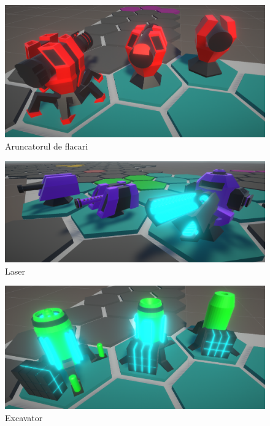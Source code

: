 \documentclass[12pt, a4paper]{article}
\begin{document}
	\begin{figure}[H]
		\centering
		\includegraphics[width=1\textwidth]{machineCannon.png}
		\caption{Aruncatorul de flacari}
		\label{fig: machineCannon}
	\end{figure}
	
	\begin{figure}[H]
		\centering
		\includegraphics[width=1\textwidth]{railgun.png}
		\caption{Laser}
		\label{fig: railgun}
	\end{figure}

	\begin{figure}[H]
		\centering
		\includegraphics[width=1\textwidth]{excavator.png}
		\caption{Excavator}
		\label{fig: excavator}
	\end{figure}
	
\end{document}
